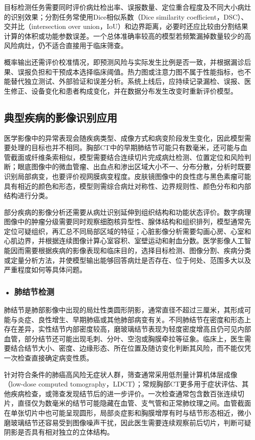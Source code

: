 目标检测任务需要同时评价病灶检出率、误报数量、定位重合程度及不同大小病灶的识别效果；分割任务常使用Dice相似系数（Dice similarity coefficient，DSC）、交并比（intersection over union，IoU）和边界距离，必要时还应比较由分割结果计算的体积或功能参数误差。一个总体准确率较高的模型若频繁漏掉数量较少的高风险病灶，仍不适合直接用于临床筛查。

概率输出还需评价校准情况，即预测风险与实际发生比例是否一致，并根据漏诊后果、误报负担和干预成本选择临床阈值。热力图或注意力图不属于性能指标，也不能替代独立测试、外部验证和误差分析。系统上线后，应持续记录漏检、误报、医生修正、设备变化和患者构成变化，并在数据分布发生改变时重新评价模型。

\subsection{典型疾病的影像识别应用}

医学影像中的异常表现会随疾病类型、成像方式和病变阶段发生变化，因此模型需要处理的目标也并不相同。胸部CT中的早期肺结节可能只有数毫米，还可能与血管截面或纤维条索相似，模型需要结合连续切片完成病灶检测、位置定位和风险判断；眼底图像中的微血管瘤、出血点和渗出区域大小不一、分布分散，分析时既要识别局部病变，也要评价视网膜病变程度。皮肤镜图像中的良性痣与黑色素瘤可能具有相近的颜色和形态，模型则需综合病灶对称性、边界规则性、颜色分布和内部结构进行分类。

部分疾病的影像分析还需要从病灶识别延伸到组织结构和功能状态评价。数字病理图像中的肿瘤分级需要同时观察细胞核异型性、腺体结构和组织排列，模型通常先定位可疑组织，再汇总不同局部区域的特征；心脏影像分析需要勾画心房、心室和心肌边界，并根据连续图像计算心室容积、室壁运动和射血分数。医学影像人工智能因而需要根据疾病的影像表现和临床目的，选择目标检测、图像分割、疾病分类或定量分析方法，并使模型输出能够回答病灶是否存在、位于何处、范围多大以及严重程度如何等具体问题。


\subsubsection*{\textbf{• 肺结节检测}}

肺结节是肺部影像中出现的局灶性类圆形阴影，通常直径不超过三厘米，其形成可能与炎症、良性增生、早期肺癌或其他肺部病变有关。不同肺结节在密度和形态上存在差异，实性结节内部密度较高，磨玻璃结节表现为轻度密度增高且仍可见内部血管，部分结节还可能出现毛刺、分叶、空泡或胸膜牵拉等征象。临床上，医生需要结合结节大小、密度、边缘形态、所在位置及随访变化判断其风险，而不能仅凭一次检查直接确定病变性质。

针对符合条件的肺癌高风险无症状人群，筛查通常采用低剂量计算机体层成像（low-dose computed tomography，LDCT）；常规胸部CT更多用于症状评估、其他疾病检查，或筛查发现结节后的进一步评价。一次检查通常包含数百张连续切片，直径仅为数毫米的结节可能隐藏在血管、支气管和正常肺纹理之间。血管截面在单张切片中也可能呈现圆形，局部炎症影和胸膜增厚有时与结节形态相近，微小磨玻璃结节还容易受到图像噪声干扰，因此医生需要连续观察前后切片，判断可疑阴影是否具有相对独立的立体结构。

